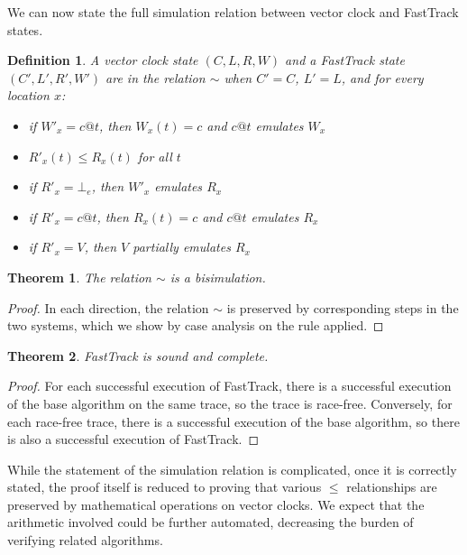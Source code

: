 \documentclass[preprint, 10pt]{sigplanconf}
\newtheorem{theorem}{Theorem}
\newtheorem{definition}{Definition}
\begin{document}
We can now state the full simulation relation between vector clock and FastTrack states.
\begin{definition}A vector clock state $(C, L, R, W)$ and a FastTrack state $(C', L', R', W')$ are in the relation $\sim$ when $C' = C$, $L' = L$, and for every location $x$:
\begin{itemize}
\item if $W'_x = c@t$, then $W_x(t) = c$ and $c@t$ emulates $W_x$
\item $R'_x(t) \le R_x(t)$ for all $t$
\item if $R'_x = \bot_e$, then $W'_x$ emulates $R_x$
\item if $R'_x = c@t$, then $R_x(t) = c$ and $c@t$ emulates $R_x$
\item if $R'_x = V$, then $V$ partially emulates $R_x$
\end{itemize}
\end{definition}
\begin{theorem}The relation $\sim$ is a bisimulation.\end{theorem}
\begin{proof}In each direction, the relation $\sim$ is preserved by corresponding steps in the two systems, which we show by case analysis on the rule applied.\end{proof}

\begin{theorem}FastTrack is sound and complete.\end{theorem}
\begin{proof}For each successful execution of FastTrack, there is a successful execution of the base algorithm on the same trace, so the trace is race-free. Conversely, for each race-free trace, there is a successful execution of the base algorithm, so there is also a successful execution of FastTrack.\end{proof}

While the statement of the simulation relation is complicated, once it is correctly stated, the proof itself is reduced to proving that various $\le$ relationships are preserved by mathematical operations on vector clocks. We expect that the arithmetic involved could be further automated, decreasing the burden of verifying related algorithms.
\end{document}
